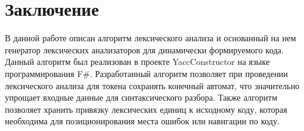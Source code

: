 \documentclass[10pt, conference, compsocconf]{IEEEtran}
\begin{document}
%



\section{Заключение}

В данной работе описан алгоритм лексического анализа и основанный на нем генератор лексических анализаторов для динамически формируемого кода. Данный алгоритм был реализован в проекте YaccConstructor на языке программирования F\#. Разработанный алгоритм позволяет при проведении лексического анализа для токена сохранять конечный автомат, что значительно упрощает входные данные для синтаксического разбора. Также алгоритм позволяет хранить привязку лексических единиц к исходному коду, которая необходима для позиционирования места ошибок или навигации по коду. 
\end{document}
